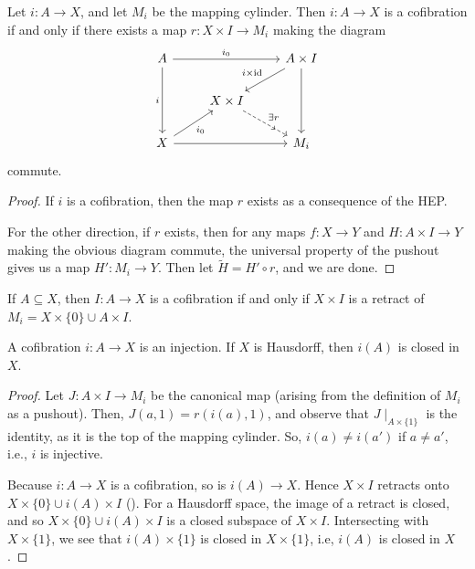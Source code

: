 \documentclass[ma3408.tex]{subfiles}
\begin{document}
\begin{Prop}\label{prop:universal_cofibration}
	Let $i \colon A \to X$, and let $M_i$ be the mapping cylinder. Then $i \colon A \to X$ is a cofibration if and only if there exists a map $r \colon X \times I \to M_i$ making the diagram
\[\begin{tikzcd}
	A && {A \times I} \\
	& {X \times I} \\
	X && {M_i}
	\arrow["i"', from=1-1, to=3-1]
	\arrow[from=3-1, to=3-3]
	\arrow["{i_0}", from=1-1, to=1-3]
	\arrow[from=1-3, to=3-3]
	\arrow["\ulcorner"{anchor=center, pos=0.125, rotate=180}, draw=none, from=3-3, to=1-1]
	\arrow["{i_0}"', from=3-1, to=2-2]
	\arrow["{i \times \text{id}}"', from=1-3, to=2-2]
	\arrow["{\exists r}", dashed, from=2-2, to=3-3]
\end{tikzcd}\]
commute. 
\end{Prop}
\begin{proof}
If $i$ is a cofibration, then the map $r$ exists as a consequence of the HEP. 

For the other direction, if $r$ exists, then for any maps $f \colon X \to Y$ and $H \colon A \times I \to Y$ making the obvious diagram commute, the universal property of the pushout gives us a map $H' \colon M_i \to Y$. Then let $\tilde H = H' \circ r$, and we are done. 
\end{proof}
\begin{Cor}\label{cor:cofibration_retract}
If $A \subseteq X$, then $I \colon A \to X$ is a cofibration if and only if $X \times I$ is a retract of $M_i = X \times \{ 0 \} \cup A \times I$. 
\end{Cor}
\begin{Cor}
A cofibration $i \colon A \to X$ is an injection. If $X$ is Hausdorff, then $i(A)$ is closed in $X$. 
\end{Cor}
\begin{proof}
Let $J \colon A \times I \to M_i$ be the canonical map (arising from the definition of $M_i$ as a pushout). Then, $J(a,1) = r(i(a),1)$, and observe that $J\mid_{A \times \{ 1 \}}$ is the identity, as it is the top of the mapping cylinder. So, $i(a) \ne i(a')$ if $a \ne a'$, i.e., $i$ is injective. 

Because $i \colon A \to X$ is a cofibration, so is $i(A) \to X$. Hence $X \times I$ retracts onto $X \times \{ 0 \} \cup i(A) \times I$ (). For a Hausdorff space, the image of a retract is closed, and so $X \times \{ 0 \} \cup i(A) \times I$ is a closed subspace of $X \times I$. Intersecting with $X \times \{ 1 \}$, we see that $i(A) \times \{ 1 \}$ is closed in $X \times \{ 1 \}$, i.e, $i(A)$ is closed in $X$.  
\end{proof}
\end{document}
